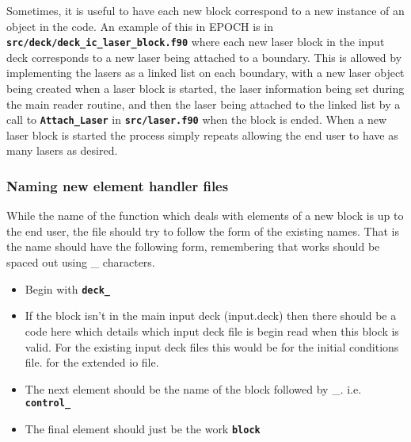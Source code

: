 \documentclass[12pt]{article}
\newcommand{\inlinecode}[1]{{\color{warwickred} \bf\texttt{#1}}}
\newcommand{\EPOCH}{{\color{warwickdark}\fontfamily{phv}\selectfont EPOCH} }
\begin{document}
Sometimes, it is useful to have each new block correspond to a new instance of
an object in the code. An example of this in \EPOCH is in
\inlinecode{src/deck/deck\_ic\_laser\_block.f90} where each new laser block in
the input deck corresponds to a new laser being attached to a boundary. This is
allowed by implementing the lasers as a linked list on each boundary, with a
new laser object being created when a laser block is started, the laser
information being set during the main reader routine, and then the laser being
attached to the linked list by a call to \inlinecode{Attach\_Laser} in
\inlinecode{src/laser.f90} when the block is ended. When a new laser block is
started the process simply repeats allowing the end user to have as many lasers
as desired.

\subsubsection{Naming new element handler files}
While the name of the function which deals with elements of a new block is up
to the end user, the file should try to follow the form of the existing
names. That is the name should have the following form, remembering that works
should be spaced out using \_ characters.
\begin{itemize}
\item Begin with \inlinecode{deck\_}
\item If the block isn't in the main input deck (input.deck) then there
  should be a code here which details which input deck file is begin read
  when this block is valid. For the existing input deck files this would be
  \subitem \inlinecode{IC\_} for the initial conditions file.
  \subitem \inlinecode{EIO\_} for the extended io file.
\item The next element should be the name of the block followed by \_.
  i.e. \inlinecode{control\_}
\item The final element should just be the work \inlinecode{block}
\end{itemize}
\end{document}

